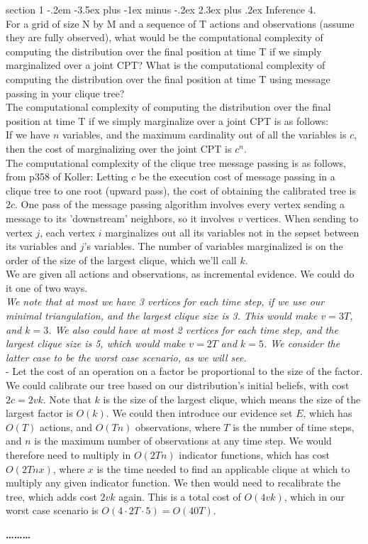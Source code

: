 \documentclass[12pt]{article}
\makeatletter
\newenvironment{problem}{\@startsection
       {section}
       {1}
       {-.2em}
       {-3.5ex plus -1ex minus -.2ex}
       {2.3ex plus .2ex}
       {\pagebreak[3]%
       \large\bf\noindent{Problem }
       }
       }
       {%
       \begin{center}\large\bf \ldots\ldots\ldots\end{center}}
\makeatother
\begin{document}
\begin{problem}{Inference}
4.\\

\noindent For a grid of size N by M and a sequence of T actions and observations (assume they are fully observed), what would be the computational complexity of computing the distribution over the final position at time T if we simply marginalized over a joint CPT?
What is the computational complexity of computing the distribution over the final position at time T using message passing in your clique tree?\\
The computational complexity of computing the distribution over the final position at time T if we simply marginalize over a joint CPT is as follows:\\
If we have $n$ variables, and the maximum cardinality out of all the variables is $c$, then the cost of marginalizing over the joint CPT is $c^n$.\\
The computational complexity of the clique tree message passing is as follows, from p358 of Koller:
Letting $c$ be the execution cost of message passing in a clique tree to one root (upward pass), the cost of obtaining the calibrated tree is $2c$.  One pass of the message passing algorithm involves every vertex sending a message to its 'downstream' neighbors, so it involves $v$ vertices.  When sending to vertex $j$, each vertex $i$ marginalizes out all its variables not in the sepset between its variables and $j$'s variables.  The number of variables marginalized is on the order of the size of the largest clique, which we'll call $k$.\\
We are given all actions and observations, as incremental evidence.  We could do it one of two ways.\\
\textit{We note that at most we have 3 vertices for each time step, if we use our minimal triangulation, and the largest clique size is 3.  This would make $v = 3T$, and $k = 3$.  We also could have at most 2 vertices for each time step, and the largest clique size is 5, which would make $v = 2T$ and $k = 5$.  We consider the latter case to be the worst case scenario, as we will see.}\\
\noindent - Let the cost of an operation on a factor be proportional to the size of the factor.  We could calibrate our tree based on our distribution's initial beliefs, with cost $2c = 2vk$.  Note that $k$ is the size of the largest clique, which means the size of the largest factor is $O(k)$.  We could then introduce our evidence set $E$, which has $O(T)$ actions, and $O(T n)$ observations, where $T$ is the number of time steps, and $n$ is the maximum number of observations at any time step.  We would therefore need to multiply in $O(2 T n)$ indicator functions, which has cost $O(2 T n x)$, where $x$ is the time needed to find an applicable clique at which to multiply any given indicator function.  We then would need to recalibrate the tree, which adds cost $2 v k$ again.  This is a total cost of $O(4 v k)$, which in our worst case scenario is $O(4 \cdot 2T \cdot 5) = O(40T)$.\\

\end{problem}
\end{document}
